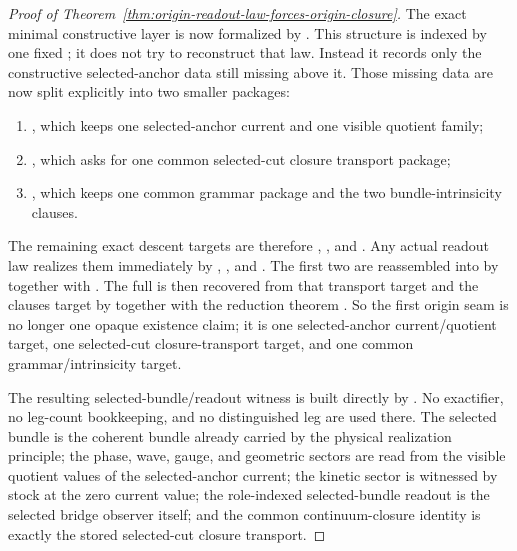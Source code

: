 \begin{proof}[Proof of Theorem~\ref{thm:origin-readout-law-forces-origin-closure}]
\label{proof:thm:origin-readout-law-forces-origin-closure}
The exact minimal constructive layer is now formalized by
. This structure is indexed by one fixed
; it does not try to reconstruct
that law. Instead it records only the constructive selected-anchor data still
missing above it. Those missing data are now split explicitly into two smaller
packages:
\begin{enumerate}
\item {}, which keeps one
      selected-anchor current and one visible quotient family;
\item {}, which asks for one
      common selected-cut closure transport package;
\item {}, which keeps one common
      grammar package and the two bundle-intrinsicity clauses.
\end{enumerate}

The remaining exact descent targets are therefore
,
, and
. Any actual readout law
realizes them immediately by
,
, and
. The first two are
reassembled into  by
 together with
.
The full  is then recovered from that
transport target and the clauses target by
 together with the reduction
theorem .
So the first origin seam is no longer one opaque existence claim; it is one
selected-anchor current/quotient target, one selected-cut closure-transport
target, and one common grammar/intrinsicity target.

The resulting selected-bundle/readout witness is built directly by
. No exactifier,
no leg-count bookkeeping, and no distinguished leg are used there. The
selected bundle is the coherent bundle already carried by the physical
realization principle; the phase, wave, gauge, and geometric sectors are read
from the visible quotient values of the selected-anchor current; the kinetic
sector is witnessed by stock at the zero current value; the role-indexed
selected-bundle readout is the selected bridge observer itself; and the common
continuum-closure identity is exactly the stored selected-cut closure
transport.


\end{proof}

